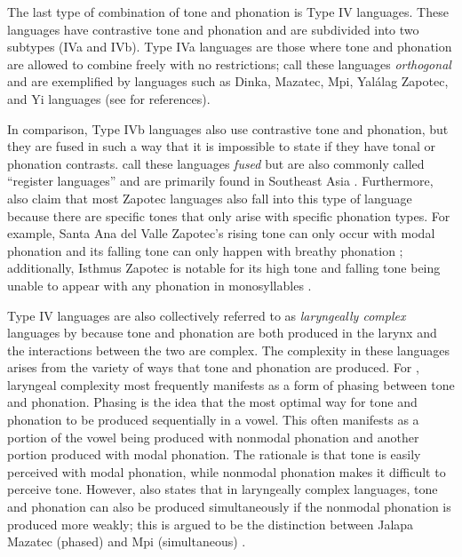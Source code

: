 The last type of combination of tone and phonation is Type IV languages. These languages have contrastive tone and phonation and are subdivided into two subtypes (IVa and IVb). Type IVa languages are those where tone and phonation are allowed to combine freely with no restrictions; \citet{espositoCrosslinguisticPatternsPhonation2020} call these languages \textit{orthogonal} and are exemplified by languages such as Dinka, Mazatec, Mpi, Yalálag Zapotec, and Yi languages (see \cite{espositoCrosslinguisticPatternsPhonation2020} for references).

In comparison, Type IVb languages also use contrastive tone and phonation, but they are fused in such a way that it is impossible to state if they have tonal or phonation contrasts. \citet{espositoCrosslinguisticPatternsPhonation2020} call these languages \textit{fused} but are also commonly called ``register languages'' and are primarily found in Southeast Asia \citep{brunelleTonePhonationSoutheast2016,enfieldArealLinguisticsMainland2005,masicaDefiningLinguisticArea1976}. Furthermore, \citet{espositoCrosslinguisticPatternsPhonation2020} also claim that most Zapotec languages also fall into this type of language because there are specific tones that only arise with specific phonation types. For example, Santa Ana del Valle Zapotec's rising tone can only occur with modal phonation and its falling tone can only happen with breathy phonation \citep{espositoVariationContrastivePhonation2010}; additionally, Isthmus Zapotec is notable for its high tone and falling tone being unable to appear with any phonation in monosyllables \citep{pickettIsthmusJuchitanZapotec2010}. 

Type IV languages are also collectively referred to as \textit{laryngeally complex} languages by \citet{silvermanLaryngealComplexityOtomanguean1997,silvermanPhasingRecoverability1997} because tone and phonation are both produced in the larynx and the interactions between the two are complex. The complexity in these languages arises from the variety of ways that tone and phonation are produced. For \citeauthor{silvermanLaryngealComplexityOtomanguean1997}, laryngeal complexity most frequently manifests as a form of phasing between tone and phonation. Phasing is the idea that the most optimal way for tone and phonation to be produced sequentially in a vowel. This often manifests as a portion of the vowel being produced with nonmodal phonation and another portion produced with modal phonation. The rationale is that tone is easily perceived with modal phonation, while nonmodal phonation makes it difficult to perceive tone. However, \citeauthor{silvermanLaryngealComplexityOtomanguean1997} also states that in laryngeally complex languages, tone and phonation can also be produced simultaneously if the nonmodal phonation is produced more weakly; this is argued to be the distinction between Jalapa Mazatec (phased) and Mpi (simultaneous) \citep{ladefogedSoundsWorldsLanguages1996,silvermanLaryngealComplexityOtomanguean1997}.  

